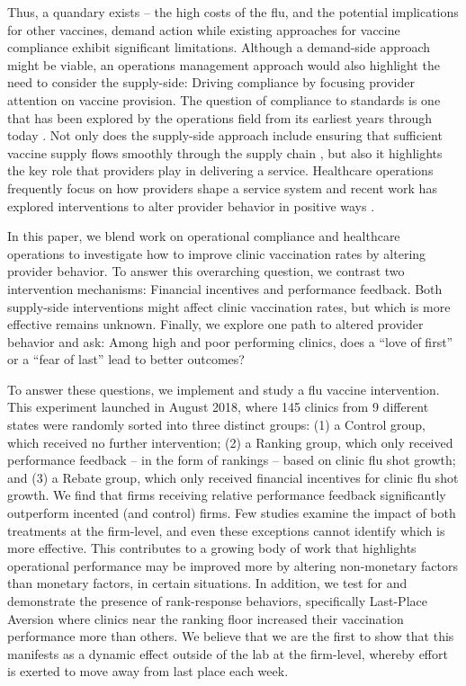 \begin{onehalfspace}
 Thus, a quandary exists – the high costs of the flu, and the potential implications for other vaccines, demand action while existing approaches for vaccine compliance exhibit significant limitations. Although a demand-side approach might be viable, an operations management approach would also highlight the need to consider the supply-side: Driving compliance by focusing provider attention on vaccine provision. The question of compliance to standards is one that has been explored by the operations field from its earliest years \citep{Taylor1911} through today \citep{Corbett2005,Andritsos2014,Senot2016,Staats2017}. Not only does the supply-side approach include ensuring that sufficient vaccine supply flows smoothly through the supply chain \citep{Deo2009,Cho2010,Arifoglu2012}, but also it highlights the key role that providers play in delivering a service. Healthcare operations frequently focus on how providers shape a service system \citep[e.g.,][]{Tucker2007,Freeman2017} and recent work has explored interventions to alter provider behavior in positive ways \citep{Tsai2015,Song2016,Dai2017,Song2018a}. 
 
 In this paper, we blend work on operational compliance and healthcare operations to investigate how to improve clinic vaccination rates by altering provider behavior. To answer this overarching question, we contrast two intervention mechanisms: Financial incentives and performance feedback. Both supply-side interventions might affect clinic vaccination rates, but which is more effective remains unknown. Finally, we explore one path to altered provider behavior and ask: Among high and poor performing clinics, does a “love of first” or a “fear of last” lead to better outcomes?
 
 To answer these questions, we implement and study a flu vaccine intervention. This experiment launched in August 2018, where 145 clinics from 9 different states were randomly sorted into three distinct groups: (1) a Control group, which received no further intervention; (2) a Ranking group, which only received performance feedback – in the form of rankings – based on clinic flu shot growth; and (3) a Rebate group, which only received financial incentives for clinic flu shot growth. We find that firms receiving relative performance feedback significantly outperform incented (and control) firms. Few studies examine the impact of both treatments at the firm-level, and even these exceptions cannot identify which is more effective. This contributes to a growing body of work that highlights operational performance may be improved more by altering non-monetary factors than monetary factors, in certain situations. In addition, we test for and demonstrate the presence of rank-response behaviors, specifically Last-Place Aversion where clinics near the ranking floor increased their vaccination performance more than others. We believe that we are the first to show that this manifests as a dynamic effect outside of the lab at the firm-level, whereby effort is exerted to move away from last place each week.
 

\end{onehalfspace}
